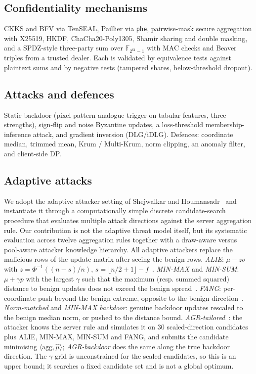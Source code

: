 \documentclass[conference]{IEEEtran}
\begin{document}
\subsection{Confidentiality mechanisms}
CKKS and BFV via TenSEAL, Paillier via \texttt{phe}, pairwise-mask secure aggregation with X25519, HKDF, ChaCha20-Poly1305, Shamir sharing and double masking, and a SPDZ-style three-party sum over $\mathbb{F}_{2^{61}-1}$ with MAC checks and Beaver triples from a trusted dealer. Each is validated by equivalence tests against plaintext sums and by negative tests (tampered shares, below-threshold dropout).
\subsection{Attacks and defences}
Static backdoor (pixel-pattern analogue trigger on tabular features, three strengths), sign-flip and noise Byzantine updates, a loss-threshold membership-inference attack, and gradient inversion (DLG/iDLG). Defences: coordinate median, trimmed mean, Krum / Multi-Krum, norm clipping, an anomaly filter, and client-side DP.
\subsection{Adaptive attacks}
We adopt the adaptive attacker setting of Shejwalkar and Houmansadr~\cite{shejwalkar2021} and instantiate it through a computationally simple discrete candidate-search procedure that evaluates multiple attack directions against the server aggregation rule. Our contribution is not the adaptive threat model itself, but its systematic evaluation across twelve aggregation rules together with a draw-aware versus pool-aware attacker knowledge hierarchy. All adaptive attackers replace the malicious rows of the update matrix after seeing the benign rows. \emph{ALIE}: $\mu-z\sigma$ with $z=\Phi^{-1}((n-s)/n)$, $s=\lfloor n/2+1\rfloor-f$~\cite{baruch2019}. \emph{MIN-MAX} and \emph{MIN-SUM}: $\mu+\gamma p$ with the largest $\gamma$ such that the maximum (resp. summed squared) distance to benign updates does not exceed the benign spread~\cite{shejwalkar2021}. \emph{FANG}: per-coordinate push beyond the benign extreme, opposite to the benign direction~\cite{fang2020}. \emph{Norm-matched} and \emph{MIN-MAX backdoor}: genuine backdoor updates rescaled to the benign median norm, or pushed to the distance bound. \emph{AGR-tailored}~\cite{shejwalkar2021}: the attacker knows the server rule and simulates it on 30 scaled-direction candidates plus ALIE, MIN-MAX, MIN-SUM and FANG, and submits the candidate minimising $\langle \mathrm{agg},\hat\mu\rangle$; \emph{AGR-backdoor} does the same along the true backdoor direction. The $\gamma$ grid is unconstrained for the scaled candidates, so this is an upper bound; it searches a fixed candidate set and is not a global optimum.
\end{document}
